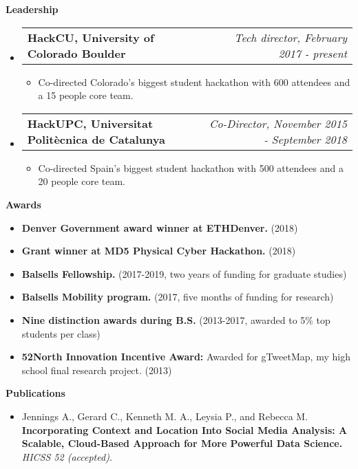 \documentclass[letterpaper,10pt]{article}
\makeatletter
\newcommand{\resitem}[1]{\item #1 \vspace{-2pt}}
\newcommand{\resheading}[1]{{\large \colorbox{mygrey}{\begin{minipage}{\textwidth}{\textbf{#1 \vphantom{p\^{E}}}}\end{minipage}}}}
\newcommand{\ressubheading}[4]{
\begin{tabular*}{7.0in}{l@{\extracolsep{\fill}}r}
		\textbf{#1} & \textit{#4} \\
\end{tabular*}\vspace{-6pt}}
\makeatother
\begin{document}

\resheading{Leadership}
	\begin{itemize}
		\item 
			\ressubheading{HackCU, University of Colorado Boulder}{Boulder, CO}{Tech director}{Tech director, February 2017 - present}
			\begin{itemize}
				\resitem{Co-directed Colorado's biggest student hackathon with 600 attendees and a 15 people core team.}
			\end{itemize}
		\item
			\ressubheading{HackUPC, Universitat Polit\`ecnica de Catalunya}{Barcelona, Spain}{Co-Director and organizer}{Co-Director, November 2015 - September 2018}
			\begin{itemize}
				\resitem{Co-directed Spain's biggest student hackathon with 500 attendees and a 20 people core team.}
			\end{itemize}
	\end{itemize}

\resheading{Awards}
	\begin{itemize}
		\resitem{\textbf{Denver Government award winner at ETHDenver.} (2018)}
		\resitem{\textbf{Grant winner at MD5 Physical Cyber Hackathon.} (2018)}
		\resitem{\textbf{Balsells Fellowship.} (2017-2019, two years of funding for graduate studies)}
		\resitem{\textbf{Balsells Mobility program.} (2017, five months of funding for research)}
		\resitem{\textbf{Nine distinction awards during B.S.} (2013-2017, awarded to 5\% top students per class)}
		\resitem{\textbf{52North Innovation Incentive Award:} Awarded for gTweetMap, my high school final research project. (2013)}
	\end{itemize}

\resheading{Publications}
	\begin{itemize}
		\item 	Jennings A., Gerard C., Kenneth M. A., Leysia P., and Rebecca M.  \textbf{Incorporating Context and Location Into Social Media Analysis: A Scalable, Cloud-Based Approach for More Powerful Data Science.}  \textit{HICSS 52 (accepted).} 
	\end{itemize}
\end{document}
